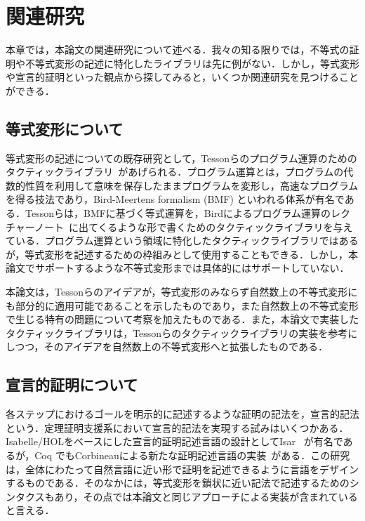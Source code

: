 \documentclass[submit]{ipsj}
\begin{document}
\section{関連研究}

本章では，本論文の関連研究について述べる．我々の知る限りでは，不等式の証明や不等式変形の記述に特化したライブラリは先に例がない．しかし，等式変形や宣言的証明といった観点から探してみると，いくつか関連研究を見つけることができる．

\subsection{等式変形について}

等式変形の記述についての既存研究として，Tessonらのプログラム運算のためのタクティックライブラリ~\cite{10.1007/978-3-642-17796-5_10}があげられる．プログラム運算とは，プログラムの代数的性質を利用して意味を保存したままプログラムを変形し，高速なプログラムを得る技法であり，Bird-Meertens formalism (BMF) といわれる体系が有名である．Tessonらは，BMFに基づく等式運算を，Birdによるプログラム運算のレクチャーノート~\cite{Bird:1987:ITL:42675.42676}に出てくるような形で書くためのタクティックライブラリを与えている．プログラム運算という領域に特化したタクティックライブラリではあるが，等式変形を記述するための枠組みとして使用することもできる．しかし，本論文でサポートするような不等式変形までは具体的にはサポートしていない．

本論文は，Tessonらのアイデアが，等式変形のみならず自然数上の不等式変形にも部分的に適用可能であることを示したものであり，また自然数上の不等式変形で生じる特有の問題について考察を加えたものである．また，本論文で実装したタクティックライブラリは，Tessonらのタクティックライブラリの実装を参考にしつつ，そのアイデアを自然数上の不等式変形へと拡張したものである．

\subsection{宣言的証明について}

各ステップにおけるゴールを明示的に記述するような証明の記法を，宣言的記法という．定理証明支援系において宣言的記法を実現する試みはいくつかある．Isabelle/HOLをベースにした宣言的証明記述言語の設計としてIsar~\cite{Bauer:2001:CRR:646528.695193} が有名であるが，Coq でもCorbineauによる新たな証明記述言語の実装~\cite{10.1007/978-3-540-68103-8_5}がある．この研究は，全体にわたって自然言語に近い形で証明を記述できるように言語をデザインするものである．そのなかには，等式変形を鎖状に近い記法で記述するためのシンタクスもあり，その点では本論文と同じアプローチによる実装が含まれていると言える．
\end{document}
